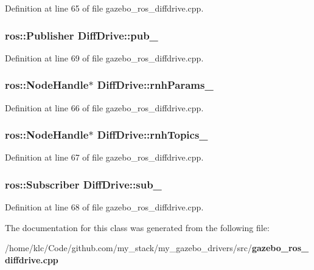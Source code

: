 Definition at line 65 of file gazebo\_\-ros\_\-diffdrive.cpp.

\subsubsection[{pub\_\-}]{\setlength{\rightskip}{0pt plus 5cm}ros::Publisher {\bf DiffDrive::pub\_\-}}\label{classDiffDrive_a7b00c16209fcfd6dc8db838906840011}


Definition at line 69 of file gazebo\_\-ros\_\-diffdrive.cpp.

\subsubsection[{rnhParams\_\-}]{\setlength{\rightskip}{0pt plus 5cm}ros::NodeHandle$\ast$ {\bf DiffDrive::rnhParams\_\-}}\label{classDiffDrive_aa68b5ef570c9542604abf1b5bd689d05}


Definition at line 66 of file gazebo\_\-ros\_\-diffdrive.cpp.

\subsubsection[{rnhTopics\_\-}]{\setlength{\rightskip}{0pt plus 5cm}ros::NodeHandle$\ast$ {\bf DiffDrive::rnhTopics\_\-}}\label{classDiffDrive_ae0abdd3d28b711a15650fddc0db08c0d}


Definition at line 67 of file gazebo\_\-ros\_\-diffdrive.cpp.

\subsubsection[{sub\_\-}]{\setlength{\rightskip}{0pt plus 5cm}ros::Subscriber {\bf DiffDrive::sub\_\-}}\label{classDiffDrive_a732405b61a7be96b377da44691ec0ec9}


Definition at line 68 of file gazebo\_\-ros\_\-diffdrive.cpp.



The documentation for this class was generated from the following file:\begin{DoxyCompactItemize}
\item 
/home/klc/Code/github.com/my\_\-stack/my\_\-gazebo\_\-drivers/src/{\bf gazebo\_\-ros\_\-diffdrive.cpp}\end{DoxyCompactItemize}
